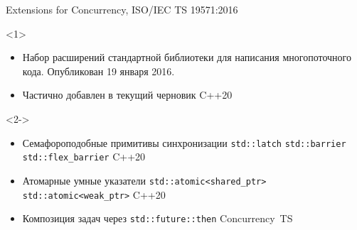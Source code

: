 \documentclass[aspectratio=169,pdf,hyperref={unicode},14pt]{beamer}
\newcommand{\isodoc}[1]{{\scriptsize \color{gray} #1}}
\begin{document}
\begin{frame}[t]{Extensions for Concurrency, ISO/IEC TS 19571:2016}
  \begin{onlyenv}<1>
    \begin{itemize}
      \item Набор расширений стандартной библиотеки для написания многопоточного кода. Опубликован 19 января 2016.
      \item Частично добавлен в текущий черновик C++20
    \end{itemize}
  \end{onlyenv}
  \begin{onlyenv}<2->
    \begin{itemize}
      \item<2-> Семафороподобные примитивы синхронизации \texttt{std::latch} \texttt{std::barrier} \texttt{std::flex\_barrier} \isodoc{C++20}
      \item<3-> Атомарные умные указатели \texttt{std::atomic<shared\_ptr>} \texttt{std::atomic<weak\_ptr>} \isodoc{C++20}
      \item<4-> Композиция задач через \texttt{std::future::then} \isodoc{Concurrency~TS}
    \end{itemize}
  \end{onlyenv}
\end{frame}
\end{document}
